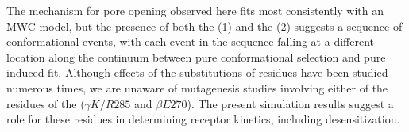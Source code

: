 \documentclass[9pt,twocolumn,twoside,lineno]{pnas-new}
\begin{document}
 The mechanism for pore opening observed here fits most consistently with an MWC model, but %
the presence of both the \fivering (1) and the \triad (2) suggests a sequence of conformational events, with each event in the sequence falling at a different location along the continuum between pure conformational selection and pure induced fit.  Although effects of the substitutions of  \fivering residues have been studied numerous times, we are unaware of mutagenesis studies involving either of the residues of the \triad ($\gamma K/R285$ and $\beta E270$).  The present simulation results suggest a role for these residues in determining receptor kinetics, including desensitization. 


\end{document}
